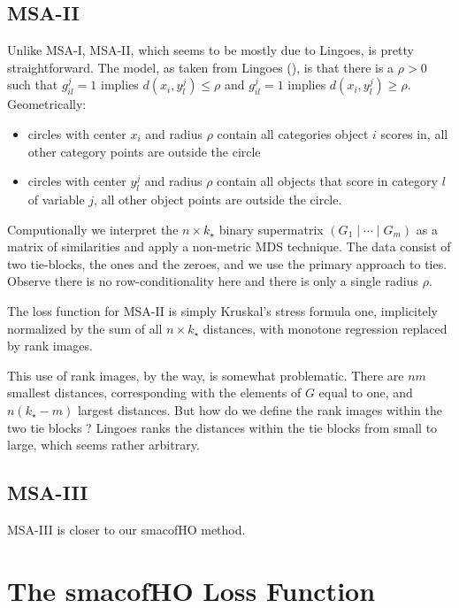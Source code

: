 \documentclass[
  12pt,
  letterpaper,
  DIV=11,
  numbers=noendperiod]{scrartcl}
\providecommand{\tightlist}{%
  \setlength{\itemsep}{0pt}\setlength{\parskip}{0pt}}\usepackage{longtable,booktabs,array}
\begin{document}
\subsection{MSA-II}\label{msa-ii}

Unlike MSA-I, MSA-II, which seems to be mostly due to Lingoes, is pretty
straightforward. The model, as taken from Lingoes
(), is that there is a \(\rho>0\) such
that \(g_{il}^j=1\) implies \(d(x_i,y_l^j)\leq\rho\) and \(g_{il}^j=1\)
implies \(d(x_i,y_l^j)\geq\rho\). Geometrically:

\begin{itemize}
\tightlist
\item
  circles with center \(x_i\) and radius \(\rho\) contain all categories
  object \(i\) scores in, all other category points are outside the
  circle
\item
  circles with center \(y_l^j\) and radius \(\rho\) contain all objects
  that score in category \(l\) of variable \(j\), all other object
  points are outside the circle.
\end{itemize}

Computionally we interpret the \(n\times k_\star\) binary supermatrix
\((G_1\mid\cdots\mid G_m)\) as a matrix of similarities and apply a
non-metric MDS technique. The data consist of two tie-blocks, the ones
and the zeroes, and we use the primary approach to ties. Observe there
is no row-conditionality here and there is only a single radius
\(\rho\).

The loss function for MSA-II is simply Kruskal's stress formula one,
implicitely normalized by the sum of all \(n\times k_\star\) distances,
with monotone regression replaced by rank images.

This use of rank images, by the way, is somewhat problematic. There are
\(nm\) smallest distances, corresponding with the elements of \(G\)
equal to one, and \(n(k_\star-m)\) largest distances. But how do we
define the rank images within the two tie blocks ? Lingoes ranks the
distances within the tie blocks from small to large, which seems rather
arbitrary.

\subsection{MSA-III}\label{msa-iii}

MSA-III is closer to our smacofHO method.

\section{The smacofHO Loss Function}\label{the-smacofho-loss-function}
\end{document}
